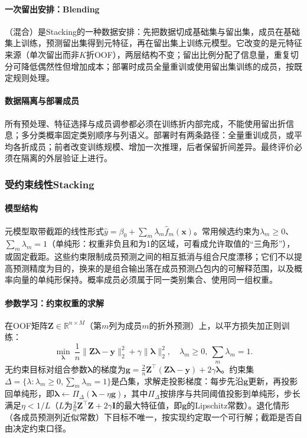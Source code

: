 \paragraph{一次留出安排：Blending}
（混合）是Stacking的一种数据安排：先把数据切成基础集与留出集，成员在基础集上训练，预测留出集得到元特征，再在留出集上训练元模型。它改变的是元特征来源（单次留出而非$K$折OOF），两层结构不变；留出比例分配了信息量，重复切分可降低偶然性但增加成本；部署时成员全量重训或使用留出集训练的成员，按既定规则处理。

\paragraph{数据隔离与部署成员}
所有预处理、特征选择与成员调参都必须在训练折内部完成，不能使用留出折信息；多分类概率固定类别顺序与列语义。部署时有两条路径：全量重训成员，或平均各折成员；前者改变训练规模、增加一次推理，后者保留折间差异。最终评价必须在隔离的外层验证上进行。

\subsubsection{受约束线性Stacking}
\label{sec:ensemble-constrained-linear-stacking}

\paragraph{模型结构}
元模型取带截距的线性形式$\hat y=\beta_0+\sum_m\lambda_m\hat f_m(\bm x)$。常用候选约束为$\lambda_m\ge0$、$\sum_m\lambda_m=1$（单纯形：权重非负且和为1的区域，可看成允许取值的“三角形”），或固定截距。这些约束限制成员预测之间的相互抵消与组合尺度漂移；它们不以提高预测精度为目的，换来的是组合输出落在成员预测凸包内的可解释范围，以及概率向量的单纯形保持。概率成员必须属于同一类别集合、使用同一组权重。

\paragraph{参数学习：约束权重的求解}
在OOF矩阵$\bm Z\in\mathbb R^{n\times M}$（第$m$列为成员$m$的折外预测）上，以平方损失加正则训练：
\begin{equation}
  \min_{\bm\lambda}\ \frac1n\lVert\bm Z\bm\lambda-\bm y\rVert_2^2+\gamma\lVert\bm\lambda\rVert_2^2,
  \quad
  \lambda_m\ge0,\ \sum_m\lambda_m=1.
  \label{eq:ensemble-constrained-obj}
\end{equation}
无约束目标对组合参数$\bm\lambda$的梯度为$\bm g=\frac{2}{n}\bm Z^\top(\bm Z\bm\lambda-\bm y)+2\gamma\bm\lambda$。约束集$\Delta=\{\lambda:\lambda_m\ge0,\sum_m\lambda_m=1\}$是凸集，求解走投影梯度：每步先沿$\bm g$更新，再投影回单纯形，即$\bm\lambda\leftarrow\Pi_\Delta(\bm\lambda-\eta\bm g)$，其中$\Pi_\Delta$按排序与共同阈值投影到单纯形，步长满足$\eta<1/L$（$L$为$\frac{2}{n}\bm Z^\top\bm Z+2\gamma\bm I$的最大特征值，即$\bm g$的Lipschitz常数）。退化情形（各成员预测列近似常数）下目标不唯一，按实现约定取一个可行解；截距是否自由决定约束口径。

